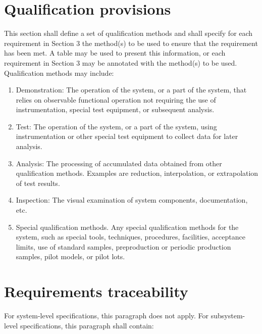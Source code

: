 \documentclass{fidata-report-template}
\begin{document}
\section{Qualification provisions}

This section shall define a set of qualification methods and shall
specify for each requirement in Section 3 the method(s) to be used to
ensure that the requirement has been met. A table may be used to present
this information, or each requirement in Section 3 may be annotated with
the method(s) to be used. Qualification methods may include:

\begin{enumerate}
\itemsep1pt\parskip0pt
\item
  Demonstration: The operation of the system, or a part of the system,
  that relies on observable functional operation not requiring the use
  of instrumentation, special test equipment, or subsequent analysis.
\item
  Test: The operation of the system, or a part of the system, using
  instrumentation or other special test equipment to collect data for
  later analysis.
\item
  Analysis: The processing of accumulated data obtained from other
  qualification methods. Examples are reduction, interpolation, or
  extrapolation of test results.
\item
  Inspection: The visual examination of system components,
  documentation, etc.
\item
  Special qualification methods. Any special qualification methods for
  the system, such as special tools, techniques, procedures, facilities,
  acceptance limits, use of standard samples, preproduction or periodic
  production samples, pilot models, or pilot lots.
\end{enumerate}

\section{Requirements traceability}

For system-level specifications, this paragraph does not apply. For
subsystem-level specifications, this paragraph shall contain:
\end{document}
